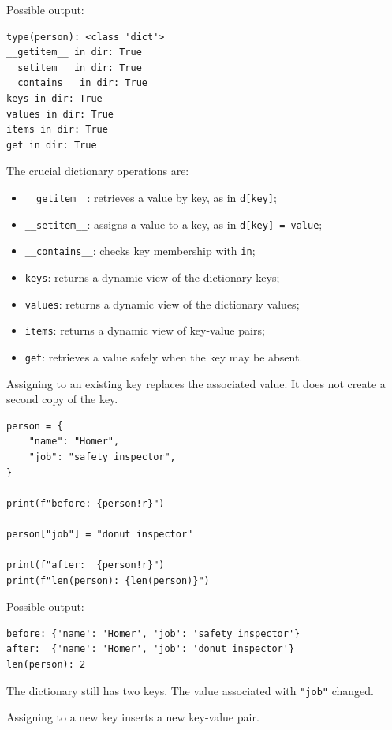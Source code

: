 Possible output:

\begin{verbatim}
type(person): <class 'dict'>
__getitem__ in dir: True
__setitem__ in dir: True
__contains__ in dir: True
keys in dir: True
values in dir: True
items in dir: True
get in dir: True
\end{verbatim}

The crucial dictionary operations are:

\begin{itemize}
    \item \texttt{\_\_getitem\_\_}: retrieves a value by key, as in \texttt{d[key]};
    \item \texttt{\_\_setitem\_\_}: assigns a value to a key, as in \texttt{d[key] = value};
    \item \texttt{\_\_contains\_\_}: checks key membership with \texttt{in};
    \item \texttt{keys}: returns a dynamic view of the dictionary keys;
    \item \texttt{values}: returns a dynamic view of the dictionary values;
    \item \texttt{items}: returns a dynamic view of key-value pairs;
    \item \texttt{get}: retrieves a value safely when the key may be absent.
\end{itemize}

Assigning to an existing key replaces the associated value. It does not create a second copy of the key.

\begin{verbatim}
person = {
    "name": "Homer",
    "job": "safety inspector",
}

print(f"before: {person!r}")

person["job"] = "donut inspector"

print(f"after:  {person!r}")
print(f"len(person): {len(person)}")
\end{verbatim}

Possible output:

\begin{verbatim}
before: {'name': 'Homer', 'job': 'safety inspector'}
after:  {'name': 'Homer', 'job': 'donut inspector'}
len(person): 2
\end{verbatim}

The dictionary still has two keys. The value associated with \texttt{"job"} changed.

Assigning to a new key inserts a new key-value pair.

